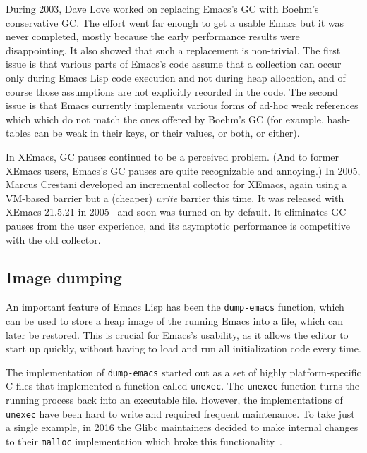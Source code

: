 \documentclass[format=acmsmall, review]{acmart}
\newcommand \Elisp {Emacs Lisp}
\begin{document}
During 2003, Dave Love worked on replacing Emacs's GC with Boehm's
conservative GC.  The effort went far enough to get a usable Emacs but it
was never completed, mostly because the early performance results were
disappointing.  It also showed that such a replacement is non-trivial.
The first issue is that various parts of Emacs's code assume that
a collection can occur only during \Elisp{} code execution and not during
heap allocation, and of course those assumptions are not explicitly recorded
in the code.  The second issue is that Emacs currently implements various
forms of ad-hoc weak references which which do not match the ones
offered by Boehm's GC (for example, hash-tables can be weak in their keys,
or their values, or both, or either).

\label{sec:incremental-gc}
In XEmacs, GC pauses continued to be a perceived problem.  (And to
former XEmacs users, Emacs's GC pauses are quite recognizable and
annoying.)
In 2005, Marcus Crestani developed an incremental collector for XEmacs,
again using a VM-based barrier but a (cheaper) \emph{write} barrier this time.
It was released with XEmacs 21.5.21 in
2005~\cite{Crestani2005} and soon was turned on by default.  It
eliminates GC pauses from the user experience, and its asymptotic
performance is competitive with the old collector.

\subsection{Image dumping}
\label{sec:image-dumping}

An important feature of \Elisp{} has been the \texttt{dump-emacs}
function, which can be used to store a heap image of the running Emacs
into a file, which can later be restored.  This is crucial for Emacs's
usability, as it allows the editor to start up quickly, without
having to load and run all initialization code every time.

The implementation of \texttt{dump-emacs} started out as a set of highly
platform-specific C files that implemented a function called
\texttt{unexec}.  The \texttt{unexec} function turns the running process
back into an executable file.  However, the implementations of
\texttt{unexec} have been hard to write and required frequent maintenance.
To take just a single example, in 2016 the Glibc maintainers decided to make
internal changes to their \texttt{malloc} implementation which broke this
functionality~\cite{UnexecGlibc}.
\end{document}

